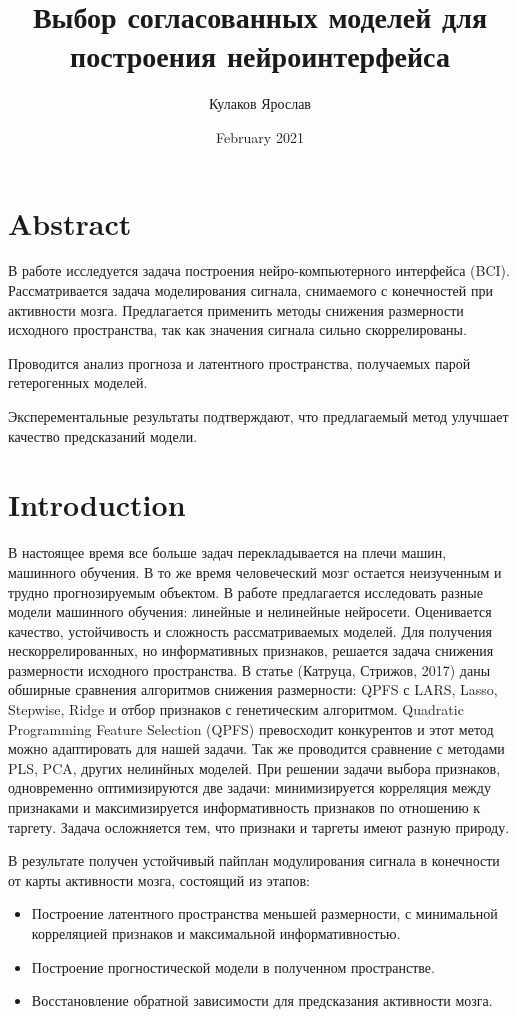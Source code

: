 \documentclass{article}
\title{Выбор согласованных моделей для построения нейроинтерфейса}
\author{Кулаков Ярослав}
\date{February 2021}
\begin{document}
\maketitle

\section{Abstract}
В работе исследуется задача построения нейро-компьютерного интерфейса (BCI). Рассматривается задача моделирования сигнала, снимаемого с конечностей при активности мозга. Предлагается применить методы снижения размерности исходного пространства, так как значения сигнала сильно скоррелированы.

Проводится анализ прогноза и латентного пространства, получаемых парой гетерогенных моделей.

Эксперементальные результаты подтверждают, что предлагаемый метод улучшает качество предсказаний модели.

\section{Introduction}
В настоящее время все больше задач перекладывается на плечи машин, машинного обучения. В то же время человеческий мозг остается неизученным и трудно прогнозируемым объектом. 
В работе предлагается исследовать разные модели машинного обучения: линейные и нелинейные нейросети. Оценивается качество, устойчивость и сложность рассматриваемых моделей. Для получения нескоррелированных, но информативных признаков, решается задача снижения размерности исходного пространства. В статье (Катруца, Стрижов, 2017) даны обширные сравнения алгоритмов снижения размерности: QPFS с LARS, Lasso, Stepwise, Ridge и отбор признаков с генетическим алгоритмом. Quadratic Programming Feature Selection (QPFS) превосходит конкурентов и этот метод можно адаптировать для нашей задачи. Так же проводится сравнение с методами PLS, PCA, других нелинйных моделей.  При решении задачи выбора признаков, одновременно оптимизируются две задачи: минимизируется корреляция между признаками и максимизируется информативность признаков по отношению к таргету. Задача осложняется тем, что признаки и таргеты имеют разную природу. \par
В результате получен устойчивый пайплан модулирования сигнала в конечности от карты активности мозга, состоящий из этапов:
\begin{itemize}
    \item Построение латентного пространства меньшей размерности, с минимальной корреляцией признаков и максимальной информативностью.
    \item Построение прогностической модели в полученном пространстве.
     \item Восстановление обратной зависимости для предсказания активности мозга.
\end{itemize}
\end{document}
